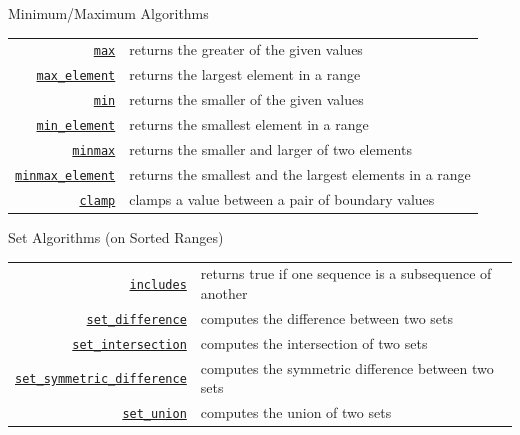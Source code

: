 \documentclass[14pt,aspectratio=1610]{beamer}
\begin{document}
\begin{frame}{Minimum/Maximum Algorithms}
\small\renewcommand{\ULdepth}{3pt}\renewcommand{\arraystretch}{1.3}
\begin{tabularx}{\textwidth}{r X}
\href{https://en.cppreference.com/w/cpp/algorithm/max}{\lstinline{max}} &
  returns the greater of the given values\\
\href{https://en.cppreference.com/w/cpp/algorithm/max_element}{\lstinline{max_element}} &
  returns the largest element in a range\\
\href{https://en.cppreference.com/w/cpp/algorithm/min}{\lstinline{min}} &
  returns the smaller of the given values\\
\href{https://en.cppreference.com/w/cpp/algorithm/min_element}{\lstinline{min_element}} &
  returns the smallest element in a range\\
\href{https://en.cppreference.com/w/cpp/algorithm/minmax}{\lstinline{minmax}} &
  returns the smaller and larger of two elements\\
\href{https://en.cppreference.com/w/cpp/algorithm/minmax_element}{\lstinline{minmax_element}} &
  returns the smallest and the largest elements in a range\\
\href{https://en.cppreference.com/w/cpp/algorithm/clamp}{\lstinline{clamp}} &
  clamps a value between a pair of boundary values\\
\end{tabularx}
\end{frame}

\begin{frame}{Set Algorithms (on Sorted Ranges)}
\small\renewcommand{\ULdepth}{3pt}\renewcommand{\arraystretch}{1.3}
\begin{tabularx}{\textwidth}{r X}
\href{https://en.cppreference.com/w/cpp/algorithm/includes}{\lstinline{includes}} &
  returns true if one sequence is a subsequence of another\\
\href{https://en.cppreference.com/w/cpp/algorithm/set_difference}{\lstinline{set_difference}} &
  computes the difference between two sets\\
\href{https://en.cppreference.com/w/cpp/algorithm/set_intersection}{\lstinline{set_intersection}} &
  computes the intersection of two sets\\
\href{https://en.cppreference.com/w/cpp/algorithm/set_symmetric_difference}{\lstinline{set_symmetric_difference}} &
  computes the symmetric difference between two sets\\
\href{https://en.cppreference.com/w/cpp/algorithm/set_union}{\lstinline{set_union}} &
  computes the union of two sets\\
\end{tabularx}
\end{frame}
\end{document}
